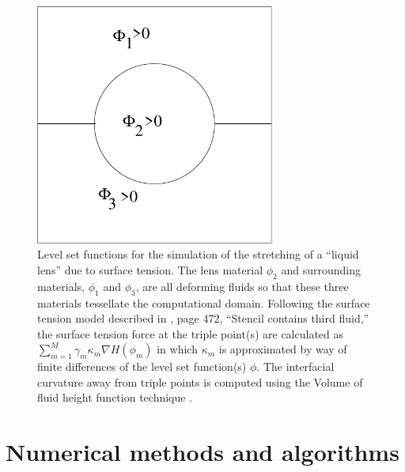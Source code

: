 \documentclass[]{article}
\begin{document}
\begin{figure}[htbp]
  \centering
    \includegraphics[width=0.7\textwidth]{liquid_lens.eps}
        \caption{Level set functions for the simulation of 
        the stretching of a ``liquid lens'' due to surface 
        tension.  The lens material $\phi_{2}$ and surrounding
        materials, $\phi_{1}$ and $\phi_{3}$, are all deforming
        fluids so that these three materials tessellate the
        computational domain.
        Following the surface tension model described in
        \cite{li2015multiphase}, page 472, ``Stencil
        contains third fluid,''         
        the surface tension force at the triple point(s) are 
        calculated as
        $\sum_{m=1}^{M} \gamma_{m}\kappa_{m}\nabla H(\phi_{m})$
        in which $\kappa_{m}$ is approximated by way of finite
        differences of the level set function(s) $\phi$. 
        The interfacial
        curvature away from triple points is computed using
        the Volume of fluid height function technique
        \cite{sussman2003second}.
    }
  \label{liquid_lens}
\end{figure}


\section{Numerical methods and algorithms}
\end{document}
